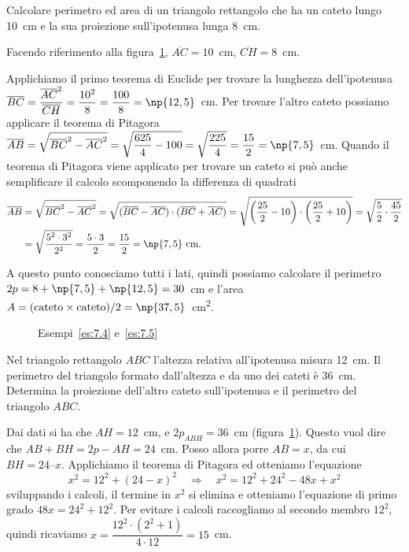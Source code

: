 \begin{exrig}
\begin{esempio}\label{es:7.4}
Calcolare perimetro ed area di un triangolo rettangolo che ha un cateto lungo 10~cm e la sua proiezione sull'ipotenusa lunga 8~cm.\vspace{7pt}

Facendo riferimento alla figura~\ref{fig:es7.4}, $\overline{AC}=10$~cm, $\overline{CH}=8$~cm.

Applichiamo il primo teorema di Euclide per trovare la lunghezza dell'ipotenusa $\overline{BC}=\dfrac{\overline{AC}^2}{\overline{CH}}=\dfrac{10^2}{8}=\dfrac{100}{8}=\np{12,5}$~cm. Per trovare l'altro cateto possiamo applicare il teorema di Pitagora $\overline{AB}=\sqrt{\overline{BC}^2-\overline{AC}^2}=\sqrt{\dfrac{625}{4}-100}=\sqrt{\dfrac{225}{4}}=\dfrac{15}{2}=\np{7,5}$~cm.
Quando il teorema di Pitagora viene applicato per trovare un cateto si può anche semplificare il calcolo scomponendo la differenza di quadrati
\begin{align*}
\overline{AB}&=\sqrt{\overline{BC}^2-\overline{AC}^2}=\sqrt{(\overline{BC}-\overline{AC})\cdot(\overline{BC}+\overline{AC})}=\sqrt{\left(\dfrac{25}{2}-10\right)\cdot\left(\dfrac{25}{2}+10\right)}=\sqrt{\dfrac{5}{2}\cdot\dfrac{45}{2}}\\
&=\sqrt{\dfrac{5^2\cdot 3^2}{2^2}}=\dfrac{5\cdot 3}{2}=\dfrac{15}{2}=\np{7,5}\text{~cm.}
\end{align*}

A questo punto conosciamo tutti i lati, quindi possiamo calcolare il perimetro $2p=8+\np{7,5}+\np{12,5}=30$~cm e l'area $A=(\text{cateto}\times\text{cateto})/2 = \np{37,5}$~cm\textsuperscript{2}.
\end{esempio}

\begin{figure}[!htb]
	\centering
	\caption{Esempi~\ref{es:7.4} e~\ref{es:7.5}}\label{fig:es7.4}
\end{figure}

\begin{esempio}\label{es:7.5}
Nel triangolo rettangolo $ABC$ l'altezza relativa all'ipotenusa misura 12~cm. Il perimetro del triangolo formato dall'altezza e da uno dei cateti è 36~cm. Determina la proiezione dell'altro cateto sull'ipotenusa e il perimetro del triangolo $ABC$.\vspace{7pt}

Dai dati si ha che $AH = 12$~cm, e $2p_{ABH} = 36$~cm (figura~\ref{fig:es7.4}).
Questo vuol dire che $AB + BH = 2p - AH = 24$~cm. 
Posso allora porre $AB = x$, da cui $BH = 24 – x$.
Applichiamo il teorema di Pitagora ed otteniamo l'equazione
\[x^2 = 12^2 + (24 - x)^2 \quad\Rightarrow\quad x^2 = 12^2 + 24^2 - 48x + x^2\]
sviluppando i calcoli, il termine in $x^2$ si elimina e otteniamo l'equazione di primo grado $48x = 24^2 + 12^2$.
Per evitare i calcoli raccogliamo al secondo membro $12^2$, quindi ricaviamo $x=\dfrac{12^2\cdot\left(2^2+1\right)}{4\cdot 12}=15$~cm.


\end{esempio}
\end{exrig}
